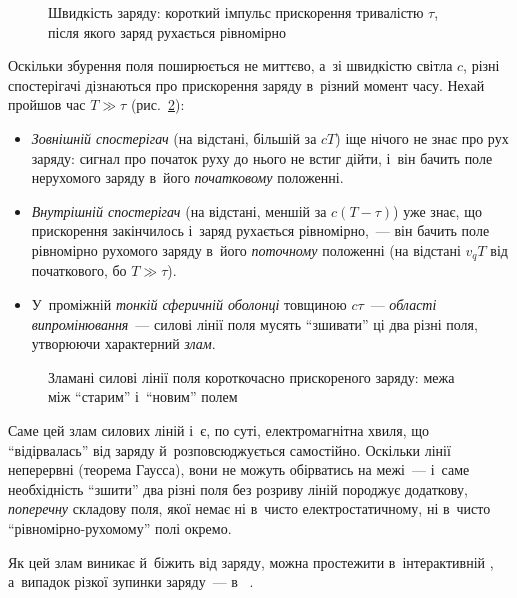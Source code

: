 \begin{figure}\centering
	\caption{Швидкість заряду: короткий імпульс прискорення тривалістю $\tau$, після якого
	заряд рухається рівномірно\label{pic:VelocityGraph}}
\end{figure}

Оскільки збурення поля поширюється не миттєво, а~зі швидкістю світла $c$, різні
спостерігачі дізнаються про прискорення заряду в~різний момент часу. Нехай пройшов час
$T\gg\tau$ (рис.~\ref{pic:ElementaryModel}):

\begin{itemize}
	\item \emph{Зовнішній спостерігач} (на відстані, більшій за $cT$) іще нічого не знає
	  про рух заряду: сигнал про початок руху до нього не встиг дійти, і~він бачить поле
	  нерухомого заряду в~його \emph{початковому} положенні.
	\item \emph{Внутрішній спостерігач} (на відстані, меншій за $c(T-\tau)$) уже знає, що
	  прискорення закінчилось і~заряд рухається рівномірно,~--- він бачить поле рівномірно
	  рухомого заряду в~його \emph{поточному} положенні (на відстані $v_qT$ від початкового, бо $T\gg\tau$).
	\item У~проміжній \emph{тонкій сферичній оболонці} товщиною $c\tau$~---
	  \emph{області випромінювання}~--- силові лінії поля мусять \enquote{зшивати} ці два
	  різні поля, утворюючи характерний \emph{злам}.
\end{itemize}

\begin{figure}[h!]\centering
	\caption{Зламані силові лінії поля короткочасно прискореного
	заряду: межа між \enquote{старим} і~\enquote{новим} полем\label{pic:ElementaryModel}}
\end{figure}

Саме цей злам силових ліній і~є, по суті, електромагнітна хвиля, що
\enquote{відірвалась} від заряду й~розповсюджується самостійно. Оскільки лінії
неперервні (теорема Гаусса), вони не можуть обірватись на межі~--- і~саме необхідність
\enquote{зшити} два різні поля без розриву ліній породжує додаткову, \emph{поперечну}
складову поля, якої немає ні в~чисто електростатичному, ні в~чисто
\enquote{рівномірно-рухомому} полі окремо.

\begin{Simulation}
Як цей злам виникає й~біжить від заряду, можна простежити в~інтерактивній
, а~випадок різкої зупинки заряду~--- в~
.
\end{Simulation}


